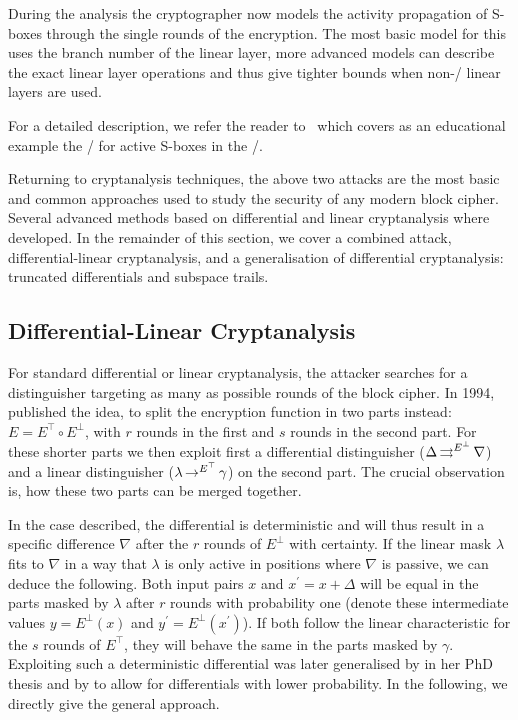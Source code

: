 During the analysis the cryptographer now models the activity propagation of S-boxes through the single rounds of the encryption.
The most basic model for this uses the branch number of the linear layer, more advanced models can describe the exact linear layer operations and thus give tighter bounds when non-\MDS/ linear layers are used.

For a detailed description, we refer the reader to~\cite{Inscrypt:MWGP11} which covers as an educational example the \MILP/ for active S-boxes in the \AES/.

Returning to cryptanalysis techniques, the above two attacks are the most basic and common approaches used to study the security of any modern block cipher.
Several advanced methods based on differential and linear cryptanalysis where developed.
In the remainder of this section, we cover a combined attack, differential-linear cryptanalysis, and a generalisation of differential cryptanalysis: truncated differentials and subspace trails.

\subsection{Differential-Linear Cryptanalysis}
For standard differential or linear cryptanalysis, the attacker searches for a distinguisher targeting as many as possible rounds of the block cipher.
In 1994, \textcite{C:LanHel94} published the idea, to split the encryption function in two parts instead: $E = E^{\top} \circ E^{\bot}$, with $r$ rounds in the first and $s$ rounds in the second part.
For these shorter parts we then exploit first a differential distinguisher ($\Delta \operatorname*{\rightrightarrows}^{E^\bot}_{} \nabla$) and a linear distinguisher ($\lambda \operatorname*{\rightarrow}^{E^\top}_{} \gamma$) on the second part.
The crucial observation is, how these two parts can be merged together.

In the case \citeauthor{C:LanHel94} described, the differential is deterministic and will thus result in a specific difference $\nabla$ after the $r$ rounds of $E^\bot$ with certainty.
If the linear mask $\lambda$ fits to $\nabla$ in a way that $\lambda$ is only active in positions where $\nabla$ is passive, we can deduce the following.
Both input pairs $x$ and $x^\prime = x + \Delta$ will be equal in the parts masked by $\lambda$ after $r$ rounds with probability one (denote these intermediate values $y = E^\bot(x)$ and $y^\prime = E^\bot(x^\prime)$).
If both follow the linear characteristic for the $s$ rounds of $E^\top$, they will behave the same in the parts masked by $\gamma$.
Exploiting such a deterministic differential was later generalised by \textcite{PhD:Langford95} in her PhD thesis and by \textcite{AC:BihDunKel02} to allow for differentials with lower probability.
In the following, we directly give the general approach.

